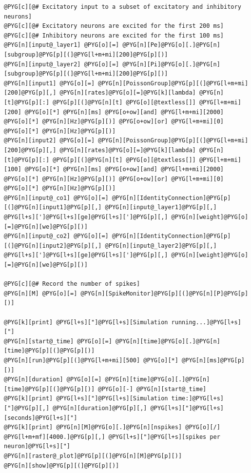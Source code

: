 \documentclass[letterpaper,10pt,english]{manual}
\begin{document}
\begin{Verbatim}[commandchars=@\[\]]
@PYG[c][@# Excitatory input to a subset of excitatory and inhibitory neurons]
@PYG[c][@# Excitatory neurons are excited for the first 200 ms]
@PYG[c][@# Inhibitory neurons are excited for the first 100 ms]
@PYG[n][input@_layer1] @PYG[o][=] @PYG[n][Pe]@PYG[o][.]@PYG[n][subgroup]@PYG[p][(]@PYG[l+m+mi][200]@PYG[p][)]
@PYG[n][input@_layer2] @PYG[o][=] @PYG[n][Pi]@PYG[o][.]@PYG[n][subgroup]@PYG[p][(]@PYG[l+m+mi][200]@PYG[p][)]
@PYG[n][input1] @PYG[o][=] @PYG[n][PoissonGroup]@PYG[p][(]@PYG[l+m+mi][200]@PYG[p][,] @PYG[n][rates]@PYG[o][=]@PYG[k][lambda] @PYG[n][t]@PYG[p][:] @PYG[p][(]@PYG[n][t] @PYG[o][@textless[]] @PYG[l+m+mi][200] @PYG[o][*] @PYG[n][ms] @PYG[o+ow][and] @PYG[l+m+mi][2000] @PYG[o][*] @PYG[n][Hz]@PYG[p][)] @PYG[o+ow][or] @PYG[l+m+mi][0] @PYG[o][*] @PYG[n][Hz]@PYG[p][)]
@PYG[n][input2] @PYG[o][=] @PYG[n][PoissonGroup]@PYG[p][(]@PYG[l+m+mi][200]@PYG[p][,] @PYG[n][rates]@PYG[o][=]@PYG[k][lambda] @PYG[n][t]@PYG[p][:] @PYG[p][(]@PYG[n][t] @PYG[o][@textless[]] @PYG[l+m+mi][100] @PYG[o][*] @PYG[n][ms] @PYG[o+ow][and] @PYG[l+m+mi][2000] @PYG[o][*] @PYG[n][Hz]@PYG[p][)] @PYG[o+ow][or] @PYG[l+m+mi][0] @PYG[o][*] @PYG[n][Hz]@PYG[p][)]
@PYG[n][input@_co1] @PYG[o][=] @PYG[n][IdentityConnection]@PYG[p][(]@PYG[n][input1]@PYG[p][,] @PYG[n][input@_layer1]@PYG[p][,] @PYG[l+s][']@PYG[l+s][ge]@PYG[l+s][']@PYG[p][,] @PYG[n][weight]@PYG[o][=]@PYG[n][we]@PYG[p][)]
@PYG[n][input@_co2] @PYG[o][=] @PYG[n][IdentityConnection]@PYG[p][(]@PYG[n][input2]@PYG[p][,] @PYG[n][input@_layer2]@PYG[p][,] @PYG[l+s][']@PYG[l+s][ge]@PYG[l+s][']@PYG[p][,] @PYG[n][weight]@PYG[o][=]@PYG[n][we]@PYG[p][)]

@PYG[c][@# Record the number of spikes]
@PYG[n][M] @PYG[o][=] @PYG[n][SpikeMonitor]@PYG[p][(]@PYG[n][P]@PYG[p][)]

@PYG[k][print] @PYG[l+s]["]@PYG[l+s][Simulation running...]@PYG[l+s]["]
@PYG[n][start@_time] @PYG[o][=] @PYG[n][time]@PYG[o][.]@PYG[n][time]@PYG[p][(]@PYG[p][)]
@PYG[n][run]@PYG[p][(]@PYG[l+m+mi][500] @PYG[o][*] @PYG[n][ms]@PYG[p][)]
@PYG[n][duration] @PYG[o][=] @PYG[n][time]@PYG[o][.]@PYG[n][time]@PYG[p][(]@PYG[p][)] @PYG[o][-] @PYG[n][start@_time]
@PYG[k][print] @PYG[l+s]["]@PYG[l+s][Simulation time:]@PYG[l+s]["]@PYG[p][,] @PYG[n][duration]@PYG[p][,] @PYG[l+s]["]@PYG[l+s][seconds]@PYG[l+s]["]
@PYG[k][print] @PYG[n][M]@PYG[o][.]@PYG[n][nspikes] @PYG[o][/] @PYG[l+m+mf][4000.]@PYG[p][,] @PYG[l+s]["]@PYG[l+s][spikes per neuron]@PYG[l+s]["]
@PYG[n][raster@_plot]@PYG[p][(]@PYG[n][M]@PYG[p][)]
@PYG[n][show]@PYG[p][(]@PYG[p][)]
\end{Verbatim}
\end{document}
